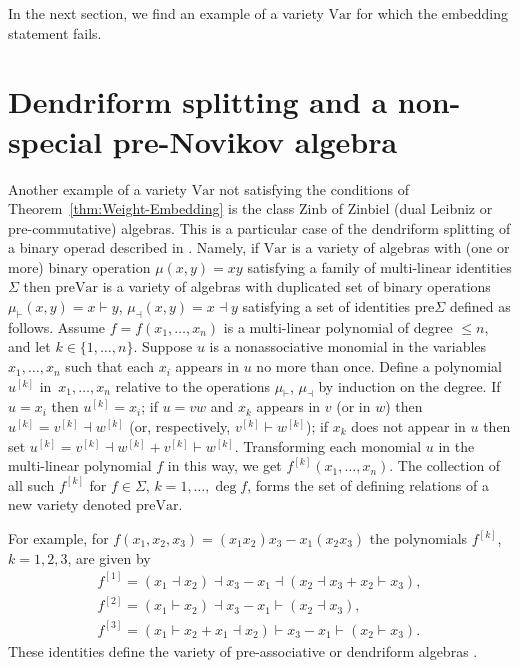 \documentclass[pdftex]{sigma}
\numberwithin{equation}{section}
\def\Var{\mathrm{Var}}
\def\Zinb{\mathrm{Zinb}}
\def\pre{\mathrm{pre}}
\begin{document}
In the next section, we find an example of a variety $\Var $
for which the embedding statement fails.

\section{Dendriform splitting and a non-special pre-Novikov algebra}

Another example of a variety
$\Var $ not satisfying the conditions
of Theorem~\ref{thm:Weight-Embedding}
is the class $\Zinb$ of Zinbiel (dual Leibniz or pre-commutative) algebras.
This is a particular case of the dendriform
splitting of a binary operad described in
\cite{BBGN, GubKol2014}.
Namely,
if $\Var $ is a variety of algebras with (one or more) binary operation
$\mu (x,y) = xy$ satisfying a family
of multi-linear identities $\Sigma $
then
$\pre\Var $ is a variety of algebras with
duplicated set of binary operations
$\mu_\vdash (x,y)=x\vdash y $,
$\mu_\dashv (x,y) = x\dashv y$
satisfying a set of identities $\pre\Sigma $
defined as follows.
Assume $f = f(x_1,\dots, x_n)$ is a multi-linear polynomial of degree $\le n$, and let $k\in \{1,\dots, n\}$.
Suppose $u$ is a nonassociative monomial in the variables
$x_1,\dots, x_n$ such that each $x_i$ appears in $u$
no more than once.
Define a polynomial~$u^{[k]}$ in~$x_1,\dots, x_n$
relative to the operations $\mu_\vdash $, $\mu _\dashv$
by induction on the degree.
If $u=x_i$ then
$u^{[k]} = x_i$;
if $u = vw$ and $x_k$ appears in $v$ (or in $w$) then
$u^{[k]} = v^{[k]}\dashv w^{[k]}$ (or, respectively,
$v^{[k]}\vdash w^{[k]}$);
if $x_k$ does not appear in $u$ then set
$u^{[k]}=
v^{[k]}\dashv w^{[k]} + v^{[k]}\vdash w^{[k]}$.
Transforming each monomial $u$ in the
multi-linear polynomial $f$
in this way, we get $f^{[k]}(x_1,\dots, x_n)$.
The collection of all such $f^{[k]}$
for $f\in \Sigma $, $k=1,\dots,\deg f$,
forms the set of defining relations of a new variety denoted
$\pre\Var $.

For example, for $f(x_1,x_2,x_3)
= (x_1x_2)x_3 - x_1(x_2x_3)$
the polynomials $f^{[k]}$, $k=1,2,3$, are given by
%
\begin{gather}
f^{[1]} = (x_1\dashv x_2)\dashv x_3 - x_1\dashv (x_2\dashv x_3 + x_2\vdash x_3),\nonumber \\
f^{[2]}
= (x_1\vdash x_2)\dashv x_3 - x_1\vdash (x_2\dashv x_3),\nonumber\\
f^{[3]}
= (x_1\vdash x_2 + x_1\dashv x_2)\vdash x_3 - x_1\vdash (x_2\vdash x_3).\label{eq:preAss}
\end{gather}
These identities define the variety of pre-associative
or dendriform algebras \cite{Loday}.
\end{document}
